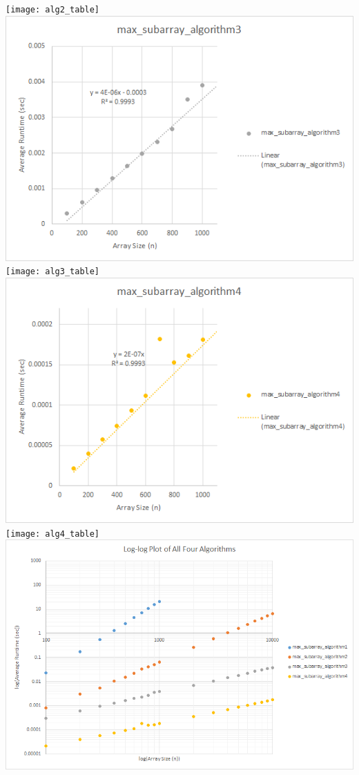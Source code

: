 \documentclass[paper=a4, fontsize=11pt]{scrartcl} %
\numberwithin{equation}{section} %
\numberwithin{figure}{section} %
\numberwithin{table}{section} %
\begin{document}
\texttt{[image: alg2\_table]}
\includegraphics[width=\textwidth]{algo3Plot}
\texttt{[image: alg3\_table]}
\includegraphics[width=\textwidth]{algo4Plot}
\texttt{[image: alg4\_table]}
\includegraphics[width=\textwidth]{all4Plot}
\end{document}
